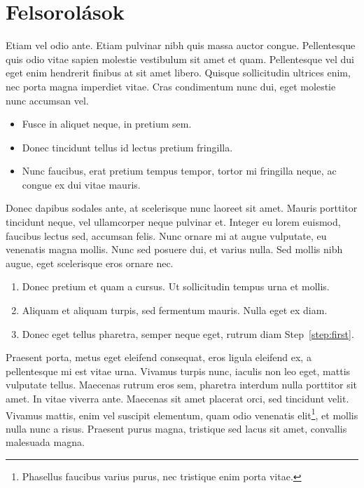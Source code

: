 \section{Felsorolások} %

Etiam vel odio ante. Etiam pulvinar nibh quis massa auctor congue. Pellentesque quis odio vitae sapien molestie vestibulum sit amet et quam. Pellentesque vel dui eget enim hendrerit finibus at sit amet libero. Quisque sollicitudin ultrices enim, nec porta magna imperdiet vitae. Cras condimentum nunc dui, eget molestie nunc accumsan vel.

\begin{itemize}
	\item Fusce in aliquet neque, in pretium sem.
	\item Donec tincidunt tellus id lectus pretium fringilla.
	\item Nunc faucibus, erat pretium tempus tempor, tortor mi fringilla neque, ac congue ex dui vitae mauris.
\end{itemize}

Donec dapibus sodales ante, at scelerisque nunc laoreet sit amet. Mauris porttitor tincidunt neque, vel ullamcorper neque pulvinar et. Integer eu lorem euismod, faucibus lectus sed, accumsan felis. Nunc ornare mi at augue vulputate, eu venenatis magna mollis. Nunc sed posuere dui, et varius nulla. Sed mollis nibh augue, eget scelerisque eros ornare nec.

\begin{enumerate}
	\item\label{step:first} Donec pretium et quam a cursus. Ut sollicitudin tempus urna et mollis.
	\item Aliquam et aliquam turpis, sed fermentum mauris. Nulla eget ex diam.
	\item Donec eget tellus pharetra, semper neque eget, rutrum diam Step~\ref{step:first}.
\end{enumerate}

Praesent porta, metus eget eleifend consequat, eros ligula eleifend ex, a pellentesque mi est vitae urna. Vivamus turpis nunc, iaculis non leo eget, mattis vulputate tellus. Maecenas rutrum eros sem, pharetra interdum nulla porttitor sit amet. In vitae viverra ante. Maecenas sit amet placerat orci, sed tincidunt velit. Vivamus mattis, enim vel suscipit elementum, quam odio venenatis elit\footnote{Phasellus faucibus varius purus, nec tristique enim porta vitae.}, et mollis nulla nunc a risus. Praesent purus magna, tristique sed lacus sit amet, convallis malesuada magna. 

